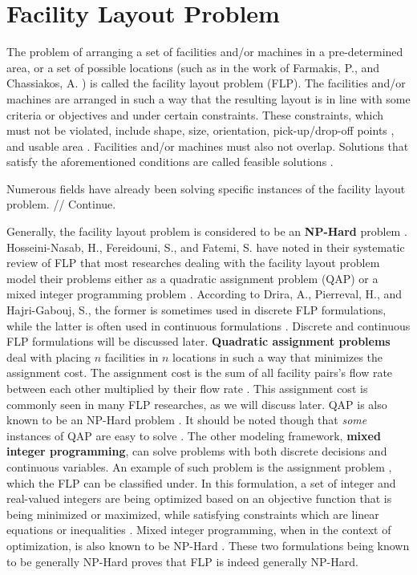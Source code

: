 \section{Facility Layout Problem}
The problem of arranging a set of facilities and/or machines in a pre-determined area, or a set of possible locations (such as in the work of Farmakis, P., and Chassiakos, A. \cite{Farmakis2018}) is called the facility layout problem (FLP). The facilities and/or machines are arranged in such a way that the resulting layout is in line with some criteria or objectives and under certain constraints. These constraints, which must not be violated, include shape, size, orientation, pick-up/drop-off points \cite{Hosseini-Nasab2018}, and usable area \cite{Fernando2015}. Facilities and/or machines must also not overlap. Solutions that satisfy the aforementioned conditions are called feasible solutions \cite{Meller1996}.

Numerous fields have already been solving specific instances of the facility layout problem. // Continue.

Generally, the facility layout problem is considered to be an \textbf{NP-Hard} problem \cite{Drira2007}. Hosseini-Nasab, H., Fereidouni, S., and Fatemi, S. have noted in their systematic review of FLP that most researches dealing with the facility layout problem model their problems either as a quadratic assignment problem (QAP) or a mixed integer programming problem \cite{Hosseini-Nasab2018}. According to Drira, A., Pierreval, H., and Hajri-Gabouj, S., the former is sometimes used in discrete FLP formulations, while the latter is often used in continuous formulations \cite{Drira2007}. Discrete and continuous FLP formulations will be discussed later. \textbf{Quadratic assignment problems} deal with placing $n$ facilities in $n$ locations in such a way that minimizes the assignment cost. The assignment cost is the sum of all facility pairs's flow rate between each other multiplied by their flow rate \cite{QAPDefinition}. This assignment cost is commonly seen in many FLP researches, as we will discuss later. QAP is also known to be an NP-Hard problem \cite{Garey1979}. It should be noted though that \textit{some} instances of QAP are easy to solve \cite{Feizollahi2015}. The other modeling framework, \textbf{mixed integer programming}, can solve problems with both discrete decisions and continuous variables. An example of such problem is the assignment problem \cite{Richards2005}, which the FLP can be classified under. In this formulation, a set of integer and real-valued integers are being optimized based on an objective function that is being minimized or maximized, while satisfying constraints which are linear equations or inequalities \cite{Wolsey2008}. Mixed integer programming, when in the context of optimization, is also known to be NP-Hard \cite{Richards2005}. These two formulations being known to be generally NP-Hard proves that FLP is indeed generally NP-Hard.

